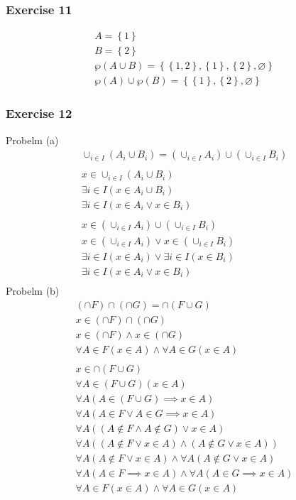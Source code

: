 \subsubsection{Exercise 11}
\begin{align*}
 A = \left\{1 \right\} \\
 B = \left\{2 \right\} \\
 \wp(A \cup B) = \left\{\left\{1,2 \right\},\left\{1 \right\}, \left\{2 \right\}, \varnothing  \right\} \\
 \wp(A) \cup \wp(B) = \left\{ \left\{1 \right\},\left\{2 \right\}, \varnothing  \right\} 
\end{align*}

\subsubsection{Exercise 12}
Probelm (a)
\begin{align*}
  \cup_{i \in I}(A_i \cup B_i) = (\cup_{i \in I}A_i) \cup (\cup_{i \in  I}B_i) \\\\
  x \in \cup_{i \in I}(A_i \cup B_i) \\
  \exists i \in I(x \in A_i \cup B_i) \\
  \exists i \in I(x \in A_i \lor x \in B_i)\\\\
  x \in (\cup_{i \in I}A_i) \cup (\cup_{i \in I}B_i) \\
  x \in (\cup_{i \in I}A_i) \lor x \in (\cup_{i \in I}B_i) \\
  \exists i \in I(x \in A_i) \lor \exists i \in I(x \in B_i) \\
  \exists i \in I(x \in A_i \lor x \in B_i) \\
\end{align*}
Probelm (b)
\begin{align*}
  (\cap F) \cap (\cap G) = \cap(F \cup G)\\
  x \in (\cap F) \cap (\cap G) \\
  x \in (\cap F) \land x \in (\cap G) \\
  \forall A \in F(x \in A) \land \forall A \in G(x \in A)\\\\
  x \in \cap(F \cup G) \\
  \forall A \in (F \cup G)(x \in A)\\
  \forall A(A \in (F \cup G) \implies x \in A) \\
  \forall A(A \in F \lor A \in G \implies x \in A)\\
  \forall A((A \notin F \land A \notin G) \lor x \in A)\\
  \forall A((A \notin F \lor x \in A) \land (A \notin G \lor x \in A))\\
  \forall A(A \notin F \lor x \in A) \land \forall A(A \notin G \lor x \in A)\\
  \forall A(A \in F \implies x \in A) \land \forall A(A \in G \implies x \in A)\\
  \forall A \in F(x \in A) \land \forall A \in G(x \in A)\\
\end{align*}
